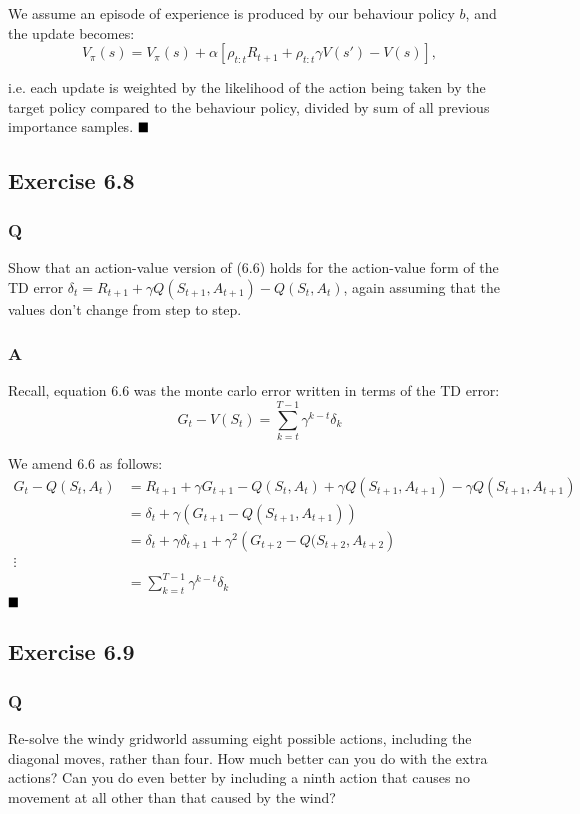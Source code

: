 We assume an episode of experience is produced by our behaviour policy $b$, and the update becomes:
\begin{equation}
V_\pi(s) = V_\pi(s) + \alpha \left[\rho_{t:t} R_{t+1} + \rho_{t:t} \gamma V(s') - V(s)\right], 
\end{equation}

i.e. each update is weighted by the likelihood of the action being taken by the target policy compared to the behaviour policy, divided by sum of all previous importance samples.
$
\hfill \blacksquare
$
\subsection{Exercise 6.8}
\subsubsection{Q}
Show that an action-value version of (6.6) holds for the action-value form of the TD error $\delta_t = R_{t+1} + \gamma Q(S_{t+1}, A_{t+1}) - Q(S_t, A_t)$, again assuming that the values don’t change from step to step.
\subsubsection{A}
Recall, equation 6.6 was the monte carlo error written in terms of the TD error:
\begin{equation}
G_t - V(S_t) = \sum_{k=t}^{T-1} \gamma^{k-t} \delta_k
\end{equation}

We amend 6.6 as follows:
\begin{align}
G_t - Q(S_t, A_t) &= R_{t+1} + \gamma G_{t+1} - Q(S_t, A_t) + \gamma Q(S_{t+1}, A_{t+1}) - \gamma Q(S_{t+1}, A_{t+1}) \\
&= \delta_t + \gamma \left(G_{t+1} - Q(S_{t+1}, A_{t+1}) \right) \\
&= \delta_t + \gamma \delta_{t+1} + \gamma^2\left(G_{t+2} - Q(S_{t+2}, A_{t+2}\right) \\
\vdots \\
&= \sum_{k=t}^{T-1} \gamma^{k-t} \delta_k
\end{align}
$
\hfill \blacksquare
$

\subsection{Exercise 6.9}
\subsubsection{Q}
Re-solve the windy gridworld assuming eight possible actions, including the diagonal moves, rather than four. How much better can you do with the extra actions? Can you do even better by including a ninth action that causes no movement at all other than that caused by the wind?
